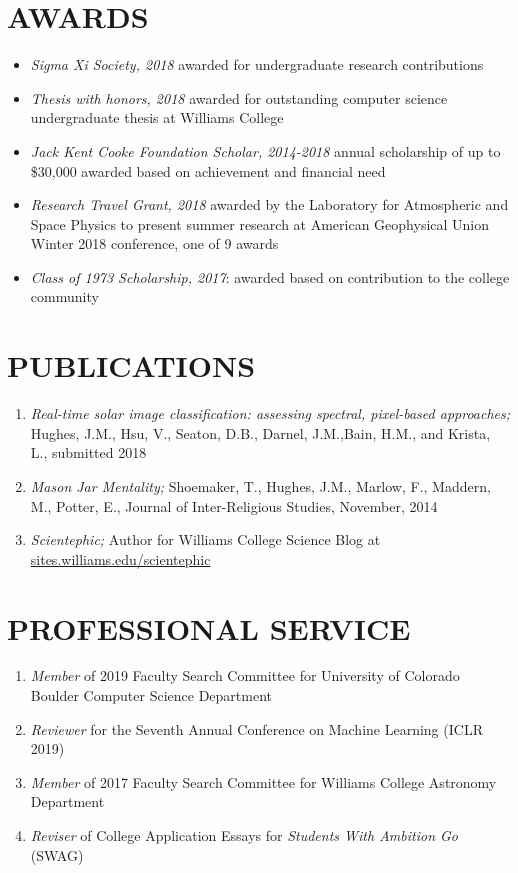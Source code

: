 \documentclass[line,margin]{res}
\begin{document}
\begin{resume}
  \section{AWARDS}
  \begin{itemize}[leftmargin=*]
    \item {\sl Sigma Xi Society, 2018} awarded for undergraduate research contributions
    \item {\sl Thesis with honors, 2018} awarded for outstanding computer science undergraduate thesis at Williams College
    \item {\sl Jack Kent Cooke Foundation Scholar, 2014-2018} annual scholarship of up to \$30,000 awarded based on achievement and financial need 
    \item {\sl Research Travel Grant, 2018} awarded by the Laboratory for Atmospheric and Space Physics to present summer research at American Geophysical Union Winter 2018 conference, one of 9 awards
    \item {\sl Class of 1973 Scholarship, 2017}: awarded based on contribution to the college community
  \end{itemize}

  \section{PUBLICATIONS}
  \begin{enumerate}[leftmargin=*]
    \item {\sl Real-time solar image classification: assessing  spectral,  pixel-based approaches;} Hughes, J.M., Hsu, V., Seaton, D.B., Darnel, J.M.,Bain, H.M., and Krista, L., submitted 2018
  \item {\sl Mason Jar Mentality;} Shoemaker, T., Hughes, J.M., Marlow, F., Maddern, M., Potter, E.,
    Journal of Inter-Religious Studies, November, 2014
  \item {\sl Scientephic;} Author for Williams College Science Blog at \href{https://sites.williams.edu/scientephic/}{sites.williams.edu/scientephic}

  \end{enumerate}

  
  \section{PROFESSIONAL SERVICE}
  \begin{enumerate}[leftmargin=*]
  \item {\sl Member} of 2019 Faculty Search Committee for University of Colorado Boulder Computer Science Department
  \item {\sl Reviewer} for the Seventh Annual Conference on Machine Learning (ICLR 2019)
  \item {\sl Member} of 2017 Faculty Search Committee for Williams College Astronomy Department
  \item {\sl Reviser} of College Application Essays for \textit{Students With Ambition Go} (SWAG)
  \end{enumerate}


\end{resume}
\end{document}
